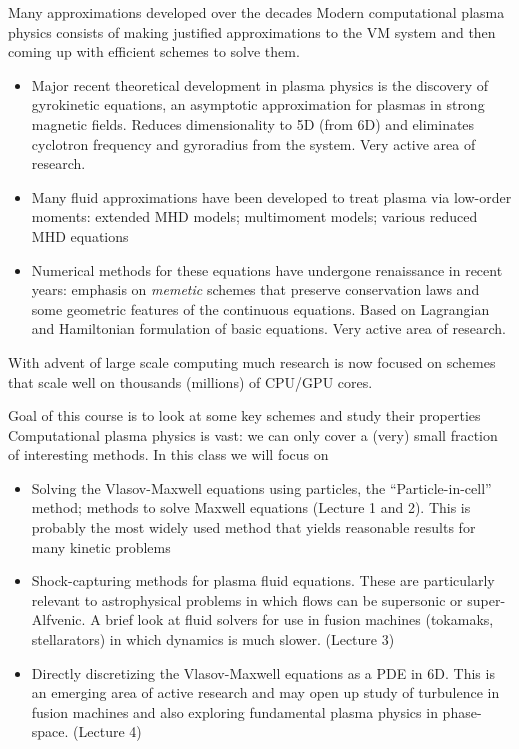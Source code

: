 \documentclass[pdf]{beamer}
\theoremstyle{definition}
\begin{document}
\begin{frame}{Many approximations developed over the decades}
  \small%
  Modern computational plasma physics consists of making justified
  approximations to the VM system and then coming up with efficient
  schemes to solve them.
  \begin{itemize}
  \item Major recent theoretical development in plasma physics is the
    discovery of gyrokinetic equations, an asymptotic approximation
    for plasmas in strong magnetic fields. Reduces dimensionality to
    5D (from 6D) and eliminates cyclotron frequency and gyroradius
    from the system. Very active area of research.
  \item Many fluid approximations have been developed to treat plasma
    via low-order moments: extended MHD models; multimoment models;
    various reduced MHD equations
  \item Numerical methods for these equations have undergone
    renaissance in recent years: emphasis on \emph{memetic} schemes
    that preserve conservation laws and some geometric features of the
    continuous equations. Based on Lagrangian and Hamiltonian
    formulation of basic equations. Very active area of research.
  \end{itemize}
  With advent of large scale computing much research is now focused on
  schemes that scale well on thousands (millions) of CPU/GPU cores.
\end{frame}

\begin{frame}{Goal of this course is to look at some key schemes and
    study their properties}
  \small%
  Computational plasma physics is vast: we can only cover a (very)
  small fraction of interesting methods. In this class we will focus
  on
  \begin{itemize}
  \item Solving the Vlasov-Maxwell equations using particles, the
    ``Particle-in-cell'' method; methods to solve Maxwell equations
    (Lecture 1 and 2). This is probably the most widely used method
    that yields reasonable results for many kinetic problems
  \item Shock-capturing methods for plasma fluid equations. These are
    particularly relevant to astrophysical problems in which flows can
    be supersonic or super-Alfvenic. A brief look at fluid solvers for
    use in fusion machines (tokamaks, stellarators) in which dynamics
    is much slower. (Lecture 3)
  \item Directly discretizing the Vlasov-Maxwell equations as a PDE in
    6D. This is an emerging area of active research and may open up
    study of turbulence in fusion machines and also exploring
    fundamental plasma physics in phase-space. (Lecture 4)
  \end{itemize}
\end{frame}
\end{document}
